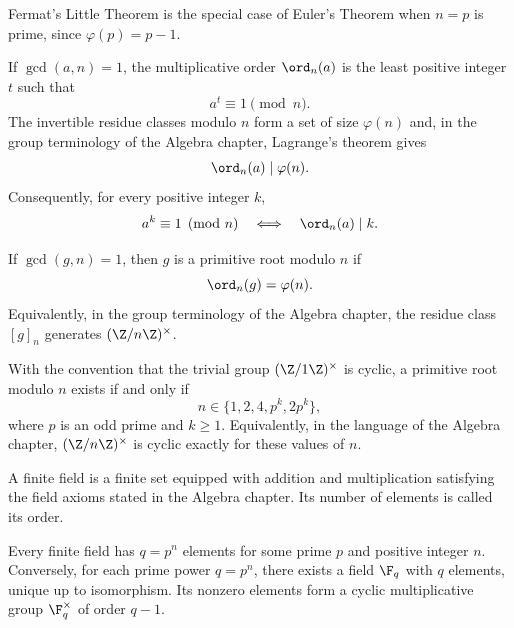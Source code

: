     \begin{remark}
        Fermat's Little Theorem is the special case of Euler's Theorem when
        $n=p$ is prime, since $\varphi(p)=p-1$.
    \end{remark}

    \begin{proposition}
        If $\gcd(a,n)=1$, the multiplicative order $\ord_n(a)$ is the least
        positive integer $t$ such that
        \[
            a^t\equiv1\pmod n.
        \]
        The invertible residue classes modulo $n$ form a set of size
        $\varphi(n)$ and, in the group terminology of the Algebra chapter,
        Lagrange's theorem gives
        \[
            \ord_n(a)\mid\varphi(n).
        \]
        Consequently, for every positive integer $k$,
        \[
            a^k\equiv 1\pmod n
            \quad\Longleftrightarrow\quad
            \ord_n(a)\mid k.
        \]
    \end{proposition}

    \begin{definition}
        If $\gcd(g,n)=1$, then $g$ is a primitive root modulo $n$ if
        \[
            \ord_n(g)=\varphi(n).
        \]
        Equivalently, in the group terminology of the Algebra chapter, the
        residue class $[g]_n$ generates $(\Z/n\Z)^\times$.
    \end{definition}

    \begin{theorem}
        With the convention that the trivial group $(\Z/1\Z)^\times$ is cyclic,
        a primitive root modulo $n$ exists if and only if
        \[
            n\in\{1,2,4,p^k,2p^k\},
        \]
        where $p$ is an odd prime and $k\geq 1$. Equivalently, in the language
        of the Algebra chapter, $(\Z/n\Z)^\times$ is cyclic exactly for these
        values of $n$.
    \end{theorem}

    \begin{definition}
        A finite field is a finite set equipped with addition and multiplication
        satisfying the field axioms stated in the Algebra chapter. Its number of
        elements is called its order.
    \end{definition}

    \begin{theorem}
        Every finite field has $q=p^n$ elements for some prime $p$ and positive
        integer $n$. Conversely, for each prime power $q=p^n$, there exists a
        field $\F_q$ with $q$ elements, unique up to isomorphism. Its
        nonzero elements form a cyclic multiplicative group
        $\F_q^\times$ of order $q-1$.
    \end{theorem}


